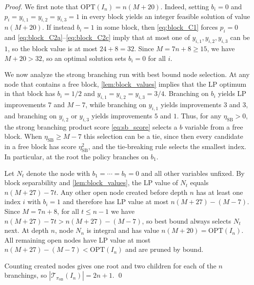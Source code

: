 \documentclass[smallextended,envcountsect]{svjour3} %
\newcommand{\Tcal}{\mathcal{T}}
\newcommand{\0}{\mathbf{0}}
\newcommand{\1}{\mathbf{1}} %
\begin{document}
\begin{proof}
	We first note that $\mathrm{OPT}(I_n)=n(M+20)$.
	Indeed, setting $b_i=0$ and $p_i=y_{i,1}=y_{i,2}=y_{i,3}=1$ in every block yields an integer feasible solution of value $n(M+20)$.
	If instead $b_i=1$ in some block, then \eqref{eq:block_C1} forces $p_i=0$ and \eqref{eq:block_C2a}--\eqref{eq:block_C2c} imply that at most one of $y_{i,1},y_{i,2},y_{i,3}$ can be $1$, so the block value is at most $24+8=32$.
	Since $M=7n+8\ge 15$, we have $M+20>32$, so an optimal solution sets $b_i=0$ for all $i$.

		We now analyze the strong branching run with best bound node selection.
		At any node that contains a free block, \cref{lem:block_values} implies that the LP optimum in that block has $b_i=1/2$ and $y_{i,1}=y_{i,2}=y_{i,3}=3/4$.
		Branching on $b_i$ yields LP improvements $7$ and $M-7$, while branching on $y_{i,1}$ yields improvements $3$ and $3$, and branching on $y_{i,2}$ or $y_{i,3}$ yields improvements $5$ and $1$.
		Thus, for any $\eta_{\mathrm{SB}}>0$, the strong branching product score \eqref{eq:sb_score} selects a $b$ variable from a free block.
		When $\eta_{\mathrm{SB}}\ge M-7$ this selection can be a tie, since then every candidate in a free block has score $\eta_{\mathrm{SB}}^2$, and the tie-breaking rule selects the smallest index.
		In particular, at the root the policy branches on $b_1$.

	Let $N_t$ denote the node with $b_1=\cdots=b_t=0$ and all other variables unfixed.
	By block separability and \cref{lem:block_values}, the LP value of $N_t$ equals $n(M+27)-7t$.
	Any other open node created before depth $n$ has at least one index $i$ with $b_i=1$ and therefore has LP value at most $n(M+27)-(M-7)$.
	Since $M=7n+8$, for all $t\le n-1$ we have $n(M+27)-7t>n(M+27)-(M-7)$, so best bound always selects $N_t$ next.
	At depth $n$, node $N_n$ is integral and has value $n(M+20)=\mathrm{OPT}(I_n)$.
	All remaining open nodes have LP value at most $n(M+27)-(M-7)<\mathrm{OPT}(I_n)$ and are pruned by bound.

	Counting created nodes gives one root and two children for each of the $n$ branchings, so $|\Tcal_{\pi_{\mathrm{SB}}}(I_n)|=2n+1$.
\qed
	\end{proof}
\end{document}
